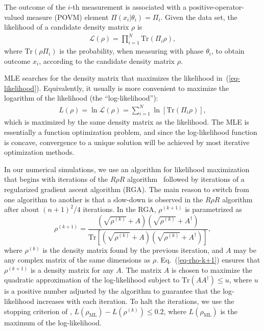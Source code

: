 \documentclass[
reprint,
superscriptaddress,
showpacs,
amsmath,
amssymb,
aps,
pra,
longbibliography
]{revtex4-1}
\begin{document}
The outcome of the $i$-th measurement is associated with a positive-operator-valued measure (POVM) element $\Pi (x_i|\theta_i) = \Pi_i$. Given the data set, the
likelihood of a candidate density matrix $\rho$ is
\begin{eqnarray}
  \mathcal{L} (\rho)= \prod_{i=1}^{N} \mathrm{Tr} (\Pi_i \rho),
  \label{eq-likelihood}
\end{eqnarray}
where $\mathrm{Tr}(\rho \Pi_i)$ is the probability, when measuring
with phase $\theta_i$, to obtain outcome $x_i$, according to the
candidate density matrix $\rho$.

MLE searches for the density matrix that maximizes the likelihood
in~(\ref{eq-likelihood}). Equivalently, it usually is more convenient
to maximize the logarithm of the likelihood (the ``log-likelihood''):
\begin{eqnarray}
  L (\rho) = \ln \mathcal{L} (\rho)= \sum_{i=1}^{N} \ln [\mathrm{Tr} (\Pi_i \rho)],
\end{eqnarray} 
which is maximized by the same density matrix as the likelihood. The
MLE is essentially a function optimization problem, and since the
log-likelihood function is concave, convergence to a unique solution 
will be achieved by most iterative optimization methods.

In our numerical simulations, we use an algorithm for likelihood
maximization that begins with iterations of the
$R\rho R$ algorithm~\cite{Rehacek2007} followed by iterations of a
regularized gradient ascent algorithm (RGA). The main reason to switch
from one algorithm to another is that a slow-down is observed in the 
$R\rho R$ algorithm after about $(n+1)^2/4$ iterations. In the RGA, 
$\rho^{(k+1)}$ is parametrized as
\begin{equation}
  \rho^{(k+1)}=\frac{\left(\sqrt{\rho^{(k)}}+A\right)\left(\sqrt{\rho^{(k)}}+A^{\dagger}\right)}{\mathrm{Tr}\left[\left(\sqrt{\rho^{(k)}}+A\right)\left(\sqrt{\rho^{(k)}}+A^{\dagger}\right)\right]},
  \label{eq-rho-k+1}
\end{equation}
where $\rho^{(k)}$ is the density matrix found by the previous iteration, and 
$A$ may be any complex matrix of the same dimensions as
$\rho$. Eq.~(\ref{eq-rho-k+1}) ensures that $\rho^{(k+1)}$ is a
density matrix for any $A$. The matrix $A$ is chosen to maximize the 
quadratic approximation of the log-likelihood subject to 
$\text{Tr}(AA^{\dagger})\leq u$, where $u$ is a positive number adjusted 
by the algorithm to guarantee that the log-likelihood increases with each 
iteration. To halt the iterations, we use the stopping criterion of \cite{Glancy2012},
$L(\rho_{\text{ML}})-L(\rho^{(k)})\leq 0.2$, where
$L(\rho_{\text{ML}})$ is the maximum of the log-likelihood.
\end{document}
